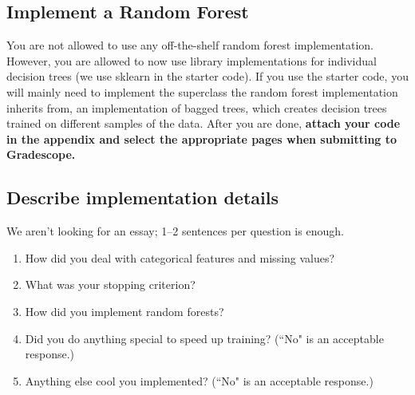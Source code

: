 \documentclass{article}
\begin{document}
\newpage
\subsection{Implement a Random Forest}
You are not allowed to use any off-the-shelf random forest implementation. 
However, you are allowed to now use library implementations for individual decision trees (we use sklearn in the starter code). 
If you use the starter code, you will mainly need to implement the superclass the random forest implementation inherits from, an implementation of bagged trees, which creates decision trees trained on different samples of the data. 
After you are done, \textbf{attach your code in the appendix and select the appropriate pages when submitting to Gradescope.}

\newpage
\subsection{Describe implementation details}
We aren't looking for an essay; 1--2 sentences per question is enough.
\begin{enumerate}
	\item How did you deal with categorical features and missing values?
	\item What was your stopping criterion?
	\item How did you implement random forests?
	\item Did you do anything special to speed up training? (``No" is an acceptable response.)
	\item Anything else cool you implemented? (``No" is an acceptable response.)
\end{enumerate}
\end{document}

